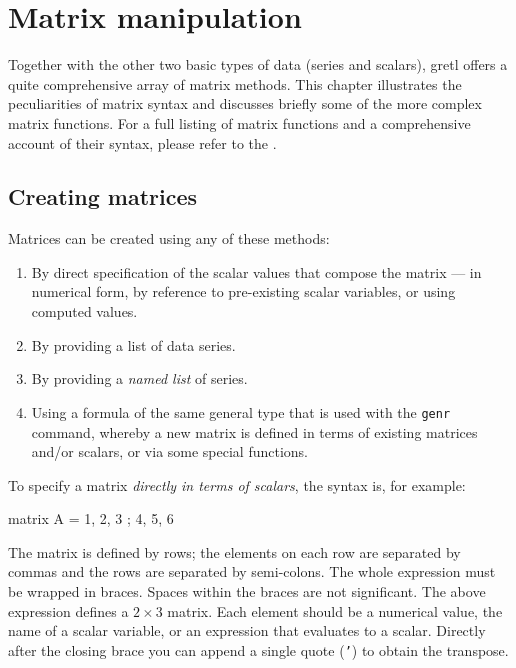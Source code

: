 \chapter{Matrix manipulation}
\label{chap:matrices}

Together with the other two basic types of data (series and scalars),
gretl offers a quite comprehensive array of matrix methods. This
chapter illustrates the peculiarities of matrix syntax and discusses
briefly some of the more complex matrix functions. For a full listing
of matrix functions and a comprehensive account of their syntax,
please refer to the \GCR.

\section{Creating matrices}
\label{sec:matrix-create}

Matrices can be created using any of these methods:

\begin{enumerate}
\item By direct specification of the scalar values that compose the
  matrix --- in numerical form, by reference to pre-existing
  scalar variables, or using computed values.
\item By providing a list of data series.
\item By providing a \textit{named list} of series.
\item Using a formula of the same general type that is used
  with the \texttt{genr} command, whereby a new matrix is defined
  in terms of existing matrices and/or scalars, or via some
  special functions.
\end{enumerate}

To specify a matrix \textit{directly in terms of scalars}, the syntax
is, for example:

\begin{code}
matrix A = {1, 2, 3 ; 4, 5, 6}
\end{code}

The matrix is defined by rows; the elements on each row are separated
by commas and the rows are separated by semi-colons.  The whole
expression must be wrapped in braces.  Spaces within the braces are
not significant.  The above expression defines a $2\times3$ matrix.
Each element should be a numerical value, the name of a scalar
variable, or an expression that evaluates to a scalar.  Directly after
the closing brace you can append a single quote (\texttt{'}) to obtain
the transpose.

